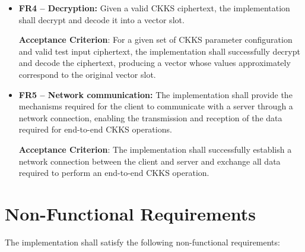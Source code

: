 \begin{itemize}
\item \textbf{FR4 -- Decryption:} Given a valid CKKS ciphertext, the implementation shall decrypt and decode it into a vector slot.

    \textbf{Acceptance Criterion}: For a given set of CKKS parameter configuration and valid test input ciphertext, the implementation shall successfully decrypt and decode the ciphertext, producing a vector whose values approximately correspond to the original vector slot.

\item \textbf{FR5 -- Network communication:} The implementation shall provide the mechanisms required for the client to communicate with a server through a network connection, enabling the transmission and reception of the data required for end-to-end CKKS operations.

    \textbf{Acceptance Criterion}: The implementation shall successfully establish a network connection between the client and server and exchange all data required to perform an end-to-end CKKS operation.

\end{itemize}

\section{Non-Functional Requirements}

The implementation shall satisfy the following non-functional requirements:

